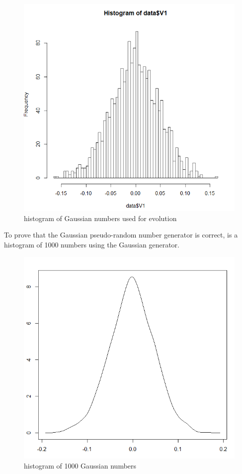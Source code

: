 \documentclass{article}
\begin{document}
\begin{figure}
    \includegraphics[width=\linewidth]{images/gaussian-1.png}
    \caption{histogram of Gaussian numbers used for evolution}
    \label{fig:gaussian-1}
\end{figure}

To prove that the Gaussian pseudo-random number generator is correct, 
is a histogram of 1000 numbers using the Gaussian generator.

\begin{figure}
    \includegraphics[width=\linewidth]{images/gaussian-2.png}
    \caption{histogram of 1000 Gaussian numbers}
    \label{fig:gaussian-2}
\end{figure}
\end{document}
